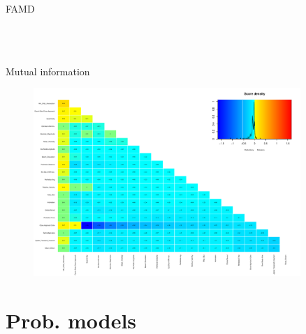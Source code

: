 \documentclass{beamer}
\begin{document}
\begin{frame}{FAMD}
\begin{columns}
\begin{figure}[h]
\begin{center}
\label{FAMD_Quantitative variables}
\end{center}
\end{figure}
\end{columns}
\end{frame}

\begin{frame}{Mutual information}
\begin{figure}
\begin{center}
\includegraphics[width=0.9\textwidth]{Pic/Mutual_information.pdf}
\label{Mutual_information}
\end{center}
\end{figure}
\end{frame}

\section{Prob. models}
\end{document}
